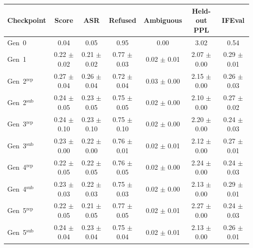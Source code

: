 \begin{tabular}{lcccccc}
\toprule
Checkpoint & Score & ASR & Refused & Ambiguous & Held-out PPL & IFEval \\
\midrule
Gen~0 & 0.04 & 0.05 & 0.95 & 0.00 & 3.02 & 0.54 \\
Gen~1 & 0.22 $\pm$ 0.02 & 0.21 $\pm$ 0.02 & 0.77 $\pm$ 0.03 & 0.02 $\pm$ 0.01 & 2.07 $\pm$ 0.00 & 0.29 $\pm$ 0.01 \\
Gen~2$^{\mathrm{rep}}$ & 0.27 $\pm$ 0.04 & 0.26 $\pm$ 0.04 & 0.72 $\pm$ 0.04 & 0.03 $\pm$ 0.00 & 2.15 $\pm$ 0.00 & 0.26 $\pm$ 0.03 \\
Gen~2$^{\mathrm{sub}}$ & 0.24 $\pm$ 0.05 & 0.23 $\pm$ 0.05 & 0.75 $\pm$ 0.05 & 0.02 $\pm$ 0.00 & 2.10 $\pm$ 0.00 & 0.27 $\pm$ 0.02 \\
Gen~3$^{\mathrm{rep}}$ & 0.24 $\pm$ 0.10 & 0.23 $\pm$ 0.10 & 0.75 $\pm$ 0.10 & 0.02 $\pm$ 0.00 & 2.20 $\pm$ 0.00 & 0.24 $\pm$ 0.03 \\
Gen~3$^{\mathrm{sub}}$ & 0.23 $\pm$ 0.00 & 0.22 $\pm$ 0.00 & 0.76 $\pm$ 0.01 & 0.02 $\pm$ 0.01 & 2.12 $\pm$ 0.00 & 0.27 $\pm$ 0.01 \\
Gen~4$^{\mathrm{rep}}$ & 0.22 $\pm$ 0.05 & 0.22 $\pm$ 0.05 & 0.76 $\pm$ 0.05 & 0.02 $\pm$ 0.00 & 2.24 $\pm$ 0.00 & 0.24 $\pm$ 0.03 \\
Gen~4$^{\mathrm{sub}}$ & 0.23 $\pm$ 0.03 & 0.22 $\pm$ 0.03 & 0.75 $\pm$ 0.03 & 0.02 $\pm$ 0.00 & 2.13 $\pm$ 0.00 & 0.29 $\pm$ 0.01 \\
Gen~5$^{\mathrm{rep}}$ & 0.22 $\pm$ 0.05 & 0.21 $\pm$ 0.05 & 0.77 $\pm$ 0.05 & 0.02 $\pm$ 0.01 & 2.27 $\pm$ 0.00 & 0.24 $\pm$ 0.03 \\
Gen~5$^{\mathrm{sub}}$ & 0.24 $\pm$ 0.04 & 0.23 $\pm$ 0.04 & 0.75 $\pm$ 0.04 & 0.02 $\pm$ 0.01 & 2.13 $\pm$ 0.00 & 0.26 $\pm$ 0.01 \\
\bottomrule
\end{tabular}
